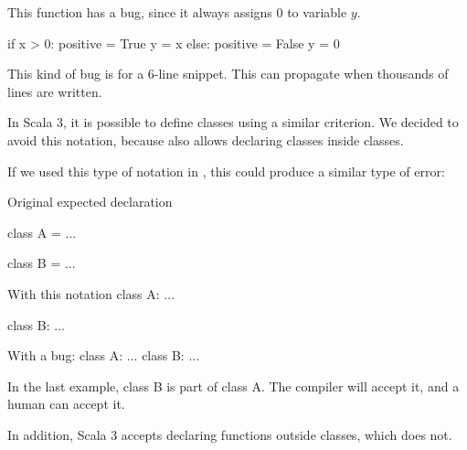 This function has a bug, since it always assigns 0 to variable $y$.

if x > 0:
positive = True
y = x
else:
positive = False
y = 0

This kind of bug is for a 6-line snippet.
This can propagate when thousands of lines are written.

In Scala 3, it is possible to define classes using a similar criterion.
We decided to avoid this notation, because \Soda also allows declaring classes inside classes.

If we used this type of notation in \Soda, this could produce a similar type of error:

Original expected declaration

class A = {
    ...
}

class B = {
    ...
}

With this notation
class A:
...

class B:
...

With a bug:
class A:
...
class B:
...

In the last example, class B is part of class A.
The compiler will accept it, and a human can accept it.

In addition, Scala 3 accepts declaring functions outside classes, which \Soda does not.

